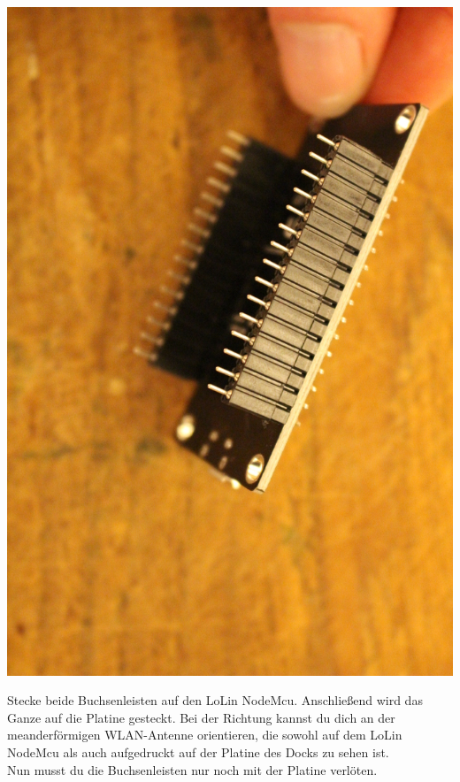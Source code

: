 \documentclass{article}
\begin{document}
\begin{minipage}[b]{0.5\textwidth}
	\includegraphics[width=\textwidth]{Bilder2019/IMG_6458.JPG}
\end{minipage}

\vspace{0.5cm}

Stecke beide Buchsenleisten auf den LoLin NodeMcu. Anschließend wird das Ganze auf die Platine gesteckt. Bei der Richtung kannst du dich an der meanderförmigen WLAN-Antenne orientieren, die sowohl auf dem LoLin NodeMcu als auch aufgedruckt auf der Platine des Docks zu sehen ist.\\

Nun musst du die Buchsenleisten nur noch mit der Platine verlöten.
\end{document}
